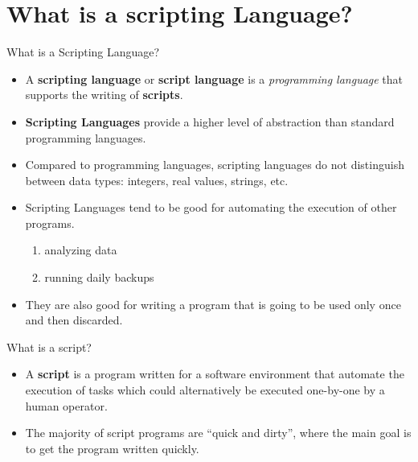 \documentclass[10pt,t]{beamer}
\newcommand*\vardiamond{\textcolor{lubrown}{%
  \ensuremath{\blacklozenge}}}
\begin{document}
\section*{What is a scripting Language?}
\begin{frame}
  \begin{exampleblock}{What is a Scripting Language?}
    \begin{itemize}
      \item A \textbf{scripting language} or \textbf{script language} is a \emph{programming language} that supports the writing of \textbf{scripts}.
      \item \textbf{Scripting Languages} provide a higher level of abstraction than standard programming languages.
      \item Compared to programming languages, scripting languages do not distinguish between data types: integers, real values, strings, etc.
      \item Scripting Languages tend to be good for automating the execution of other programs.
      \begin{enumerate}
          \item[$\vardiamond$] analyzing data
          \item[$\vardiamond$] running daily backups
      \end{enumerate}
      \item They are also good for writing a program that is going to be used only once and then discarded.
    \end{itemize}
  \end{exampleblock}
  \begin{exampleblock}{What is a script?}
    \begin{itemize}
      \item A \textbf{script} is a program written for a software environment that automate the execution of tasks which could alternatively be executed one-by-one by a human operator.
      \item The majority of script programs are ``quick and dirty'', where the main goal is to get the program written quickly.
    \end{itemize}
  \end{exampleblock}
\end{frame}
\end{document}
